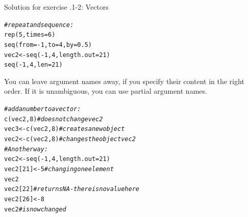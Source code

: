 \documentclass[xcolor=table,       handout,    xcolor=dvipsnames]{beamer}\usepackage[]{graphicx}\usepackage[]{color}
\makeatletter
\newcommand{\hlnum}[1]{\textcolor[rgb]{0,0,0}{#1}}
\newcommand{\hlcom}[1]{\textcolor[rgb]{0,0.392,0}{\textit{#1}}}
\newcommand{\hlopt}[1]{\textcolor[rgb]{0,0,0}{#1}}
\newcommand{\hlstd}[1]{\textcolor[rgb]{0,0,0}{#1}}
\newcommand{\hlkwb}[1]{\textcolor[rgb]{0,0,0}{#1}}
\newcommand{\hlkwc}[1]{\textcolor[rgb]{1,0,1}{#1}}
\newcommand{\hlkwd}[1]{\textcolor[rgb]{0,0,1}{#1}}
\newenvironment{kframe}{%
 \def\at@end@of@kframe{}%
 \ifinner\ifhmode%
  \def\at@end@of@kframe{\end{minipage}}%
  \begin{minipage}{\columnwidth}%
 \fi\fi%
 \def\FrameCommand##1{\hskip\@totalleftmargin \hskip-\fboxsep
 \colorbox{shadecolor}{##1}\hskip-\fboxsep
     \hskip-\linewidth \hskip-\@totalleftmargin \hskip\columnwidth}%
 \MakeFramed {\advance\hsize-\width
   \@totalleftmargin\z@ \linewidth\hsize
   \@setminipage}}%
 {\par\unskip\endMakeFramed%
 \at@end@of@kframe}
\newenvironment{knitrout}{}{} %
\newcounter{exercisecount}
\makeatother
\begin{document}

\begin{frame}[fragile]{Solution for exercise .1-2: Vectors}
\vspace{-0.5em}
\begin{knitrout}\small
{}\color{fgcolor}\begin{kframe}
\begin{alltt}
\hlcom{# repeat and sequence:}
\hlkwd{rep}\hlstd{(}\hlnum{5}\hlstd{,} \hlkwc{times}\hlstd{=}\hlnum{6}\hlstd{)}
\hlkwd{seq}\hlstd{(}\hlkwc{from}\hlstd{=}\hlopt{-}\hlnum{1}\hlstd{,} \hlkwc{to}\hlstd{=}\hlnum{4}\hlstd{,} \hlkwc{by}\hlstd{=}\hlnum{0.5}\hlstd{)}
\hlstd{vec2} \hlkwb{<-} \hlkwd{seq}\hlstd{(}\hlopt{-}\hlnum{1}\hlstd{,} \hlnum{4}\hlstd{,} \hlkwc{length.out}\hlstd{=}\hlnum{21}\hlstd{)}
\hlkwd{seq}\hlstd{(}\hlopt{-}\hlnum{1}\hlstd{,} \hlnum{4}\hlstd{,} \hlkwc{len}\hlstd{=}\hlnum{21}\hlstd{)}
\end{alltt}
\end{kframe}
\end{knitrout}
\vspace{-0.5em}
\small You can leave argument names away, if you specify their content in the right order.
If it is unambiguous, you can use partial argument names.
\normalsize
\vspace{-0.5em}
\onslide<+->
\begin{knitrout}\small
{}\color{fgcolor}\begin{kframe}
\begin{alltt}
\hlcom{# add a number to a vector:}
\hlkwd{c}\hlstd{(vec2,} \hlnum{8}\hlstd{)} \hlcom{# does not change vec2}
\hlstd{vec3} \hlkwb{<-} \hlkwd{c}\hlstd{(vec2,} \hlnum{8}\hlstd{)} \hlcom{# creates a new object}
\hlstd{vec2} \hlkwb{<-} \hlkwd{c}\hlstd{(vec2,} \hlnum{8}\hlstd{)} \hlcom{# changes the object vec2}
\hlcom{# Another way:}
\hlstd{vec2} \hlkwb{<-} \hlkwd{seq}\hlstd{(}\hlopt{-}\hlnum{1}\hlstd{,} \hlnum{4}\hlstd{,} \hlkwc{length.out}\hlstd{=}\hlnum{21}\hlstd{)}
\hlstd{vec2[}\hlnum{21}\hlstd{]} \hlkwb{<-} \hlnum{5} \hlcom{# changing one element}
\hlstd{vec2}
\hlstd{vec2[}\hlnum{22}\hlstd{]} \hlcom{# returns NA - there is no value here}
\hlstd{vec2[}\hlnum{26}\hlstd{]} \hlkwb{<-} \hlnum{8}
\hlstd{vec2} \hlcom{# is now changed}
\end{alltt}
\end{kframe}
\end{knitrout}
\end{frame}
\end{document}
